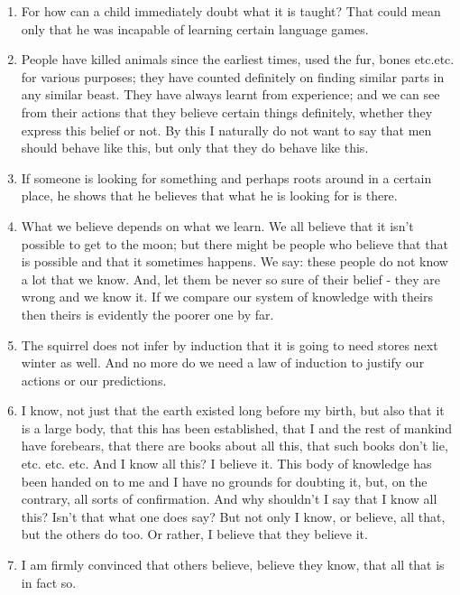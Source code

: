 \documentclass{book}
\begin{document}
\begin{enumerate}
\item
For how can a child immediately doubt what it is taught? That could mean only
that he was incapable of learning certain language games.

\item
People have killed animals since the earliest times, used the fur, bones
etc.etc. for various purposes; they have counted definitely on finding similar
parts in any similar beast.  They have always learnt from experience; and we
can see from their actions that they believe certain things definitely, whether
they express this belief or not. By this I naturally do not want to say that
men should behave like this, but only that they do behave like this.

\item
If someone is looking for something and perhaps roots around in a certain
place, he shows that he believes that what he is looking for is there.

\item
What we believe depends on what we learn. We all believe that it isn't possible
to get to the moon; but there might be people who believe that that is possible
and that it sometimes happens. We say: these people do not know a lot that we
know. And, let them be never so sure of their belief - they are wrong and we
know it.  If we compare our system of knowledge with theirs then theirs is
evidently the poorer one by far.

\item
The squirrel does not infer by induction that it is going to need stores next
winter as well. And no more do we need a law of induction to justify our
actions or our predictions.

\item
I know, not just that the earth existed long before my birth, but also that it
is a large body, that this has been established, that I and the rest of mankind
have forebears, that there are books about all this, that such books don't lie,
etc. etc. etc. And I know all this? I believe it. This body of knowledge has
been handed on to me and I have no grounds for doubting it, but, on the
contrary, all sorts of confirmation.  And why shouldn't I say that I know all
this? Isn't that what one does say?  But not only I know, or believe, all that,
but the others do too. Or rather, I believe that they believe it.

\item
I am firmly convinced that others believe, believe they know, that all that is
in fact so.


\end{enumerate}
\end{document}
